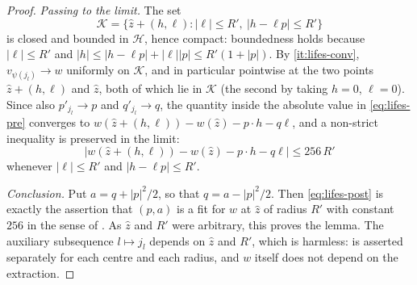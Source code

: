 \begin{proof}
\emph{Passing to the limit.} The set
\[
  \mathcal K=\bigl\{\hat z+(h,\ell):|\ell|\le R',\ |h-\ell p|\le R'\bigr\}
\]
is closed and bounded in $\mathcal H$, hence compact: boundedness holds because
$|\ell|\le R'$ and $|h|\le|h-\ell p|+|\ell||p|\le R'(1+|p|)$. By
\ref{it:lifes-conv}, $v_{\psi(j_l)}\to w$ uniformly on $\mathcal K$, and in
particular pointwise at the two points $\hat z+(h,\ell)$ and $\hat z$, both of
which lie in $\mathcal K$ (the second by taking $h=0$, $\ell=0$). Since also
$p'_{j_l}\to p$ and $q'_{j_l}\to q$, the quantity inside the absolute value in
\eqref{eq:lifes-pre} converges to
$w(\hat z+(h,\ell))-w(\hat z)-p\cdot h-q\ell$, and a non-strict inequality is
preserved in the limit:
\begin{equation}\label{eq:lifes-post}
  \bigl|w(\hat z+(h,\ell))-w(\hat z)-p\cdot h-q\ell\bigr|\le256\,R'
\end{equation}
whenever $|\ell|\le R'$ and $|h-\ell p|\le R'$.

\emph{Conclusion.} Put $a=q+|p|^2/2$, so that $q=a-|p|^2/2$. Then
\eqref{eq:lifes-post} is exactly the assertion that $(p,a)$ is a fit for $w$ at
$\hat z$ of radius $R'$ with constant $256$ in the sense of .
As $\hat z$ and $R'$ were arbitrary, this proves the lemma. The auxiliary
subsequence $l\mapsto j_l$ depends on $\hat z$ and $R'$, which is harmless:
 is asserted separately for each centre and each radius, and
$w$ itself does not depend on the extraction.
\end{proof}
